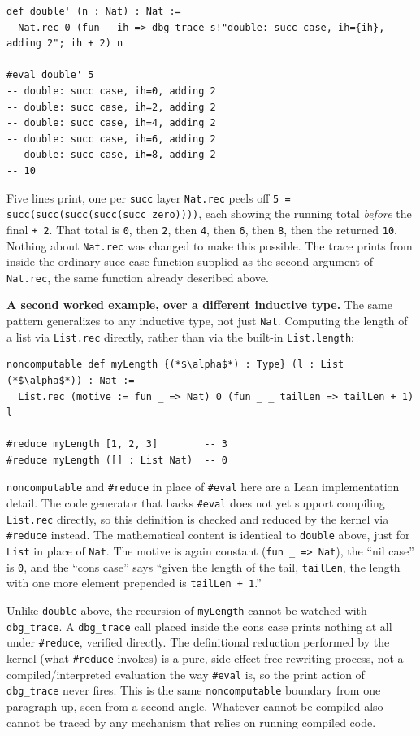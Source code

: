 \begin{lstlisting}
def double' (n : Nat) : Nat :=
  Nat.rec 0 (fun _ ih => dbg_trace s!"double: succ case, ih={ih}, adding 2"; ih + 2) n

#eval double' 5
-- double: succ case, ih=0, adding 2
-- double: succ case, ih=2, adding 2
-- double: succ case, ih=4, adding 2
-- double: succ case, ih=6, adding 2
-- double: succ case, ih=8, adding 2
-- 10
\end{lstlisting}

Five lines print, one per \texttt{succ} layer \texttt{Nat.rec} peels off \texttt{5 = succ(succ(succ(succ(succ zero))))}, each showing the running total \emph{before} the final \texttt{+ 2}. That total is \texttt{0}, then \texttt{2}, then \texttt{4}, then \texttt{6}, then \texttt{8}, then the returned \texttt{10}. Nothing about \texttt{Nat.rec} was changed to make this possible. The trace prints from inside the ordinary succ-case function supplied as the second argument of \texttt{Nat.rec}\allowbreak{}, the same function already described above.

\textbf{A second worked example, over a different inductive type.} The same pattern generalizes to any inductive type, not just \texttt{Nat}. Computing the length of a list via \texttt{List.rec} directly, rather than via the built-in \texttt{List.length}:

\begin{lstlisting}
noncomputable def myLength {(*$\alpha$*) : Type} (l : List (*$\alpha$*)) : Nat :=
  List.rec (motive := fun _ => Nat) 0 (fun _ _ tailLen => tailLen + 1) l

#reduce myLength [1, 2, 3]        -- 3
#reduce myLength ([] : List Nat)  -- 0
\end{lstlisting}

\texttt{noncomputable} and \texttt{\#reduce} in place of \texttt{\#eval} here are a Lean implementation detail. The code generator that backs \texttt{\#eval} does not yet support compiling \texttt{List.rec} directly, so this definition is checked and reduced by the kernel via \texttt{\#reduce} instead. The mathematical content is identical to \texttt{double} above, just for \texttt{List} in place of \texttt{Nat}. The motive is again constant (\texttt{fun \_\allowbreak{} => Nat}), the ``nil case'' is \texttt{0}, and the ``cons case'' says ``given the length of the tail, \texttt{tailLen}, the length with one more element prepended is \texttt{tailLen + 1}.''

Unlike \texttt{double} above, the recursion of \texttt{myLength} cannot be watched with \texttt{dbg\_\allowbreak{}trace}. A \texttt{dbg\_\allowbreak{}trace} call placed inside the cons case prints nothing at all under \texttt{\#reduce}, verified directly. The definitional reduction performed by the kernel (what \texttt{\#reduce} invokes) is a pure, side-effect-free rewriting process, not a compiled/interpreted evaluation the way \texttt{\#eval} is, so the print action of \texttt{dbg\_\allowbreak{}trace} never fires. This is the same \texttt{noncomputable} boundary from one paragraph up, seen from a second angle. Whatever cannot be compiled also cannot be traced by any mechanism that relies on running compiled code.

